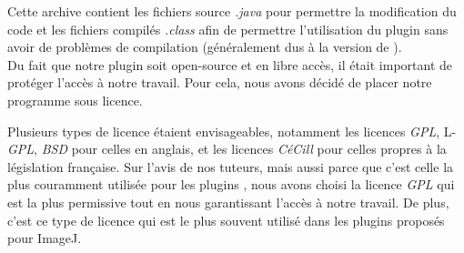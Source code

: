 Cette archive contient les fichiers source \emph{.java} pour permettre la modification du code et les fichiers compilés \emph{.class} afin de permettre l'utilisation du plugin sans avoir de problèmes de compilation (généralement dus à la version de \java ). \\

Du fait que notre plugin soit open-source et en libre accès, il était important de protéger l'accès à notre travail. Pour cela, nous avons décidé de placer notre programme sous licence.

Plusieurs types de licence étaient envisageables, notamment les licences \emph{GPL}, L-\emph{GPL}, \emph{BSD} pour celles en anglais, et les licences \emph{CéCill} pour celles propres à la législation française. Sur l'avis de nos tuteurs, mais aussi parce que c'est celle la plus couramment utilisée pour les plugins \imj , nous avons choisi la licence \emph{GPL} qui est la plus permissive tout en nous garantissant l'accès à notre travail. De plus, c'est ce type de licence qui est le plus souvent utilisé dans les plugins proposés pour ImageJ.

